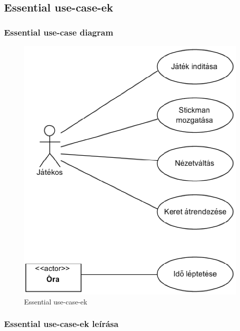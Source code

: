 \subsection{Essential use-case-ek}
	\subsubsection{Essential use-case diagram}
	
		\begin{figure}[h!]
			\begin{center}
				\includegraphics[scale=0.5]{resources/essential_use_cases.png}
				\caption{Essential use-case-ek}
			\end{center}
		\end{figure}
						
	\subsubsection{Essential use-case-ek leírása}
	
